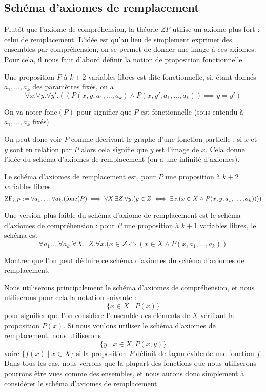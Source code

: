 \subsection{Schéma d'axiomes de remplacement}

Plutôt que l'axiome de compréhension, la théorie $ZF$ utilise un axiome plus fort : celui de remplacement. L'idée est qu'au lieu de simplement exprimer des ensembles par compréhension, on se permet de donner une image à ces axiomes. Pour cela, il nous faut d'abord définir la notion de proposition fonctionnelle.

\begin{defi}
    Une proposition $P$ à $k+2$ variables libres est dite fonctionnelle, si, étant donnés $a_1,\ldots,a_k$ des paramètres fixés, on a $$\forall x.\forall y.\forall y'. ((P(x,y,a_1,\ldots,a_k)\land P(x,y',a_1,\ldots,a_k))\implies y=y')$$

    On va noter $\mathrm{fonc}(P)$ pour signifier que $P$ est fonctionnelle (sous-entendu à $a_1,\ldots,a_k$ fixés).
\end{defi}

On peut donc voir $P$ comme décrivant le graphe d'une fonction partielle : si $x$ et $y$ sont en relation par $P$ alors cela signifie que $y$ est l'image de $x$. Cela donne l'idée du schéma d'axiomes de remplacement (on a une infinité d'axiomes).

\begin{ax}[Remplacement]
    Le schéma d'axiomes de remplacement est, pour $P$ une proposition à $k+2$ variables libres : $$\mathrm{ZF}_{7,P} := \forall a_1.\ldots\forall a_k.(\mathrm{fonc}(P)\implies \forall X.\exists Z. \forall y. (y\in Z \iff \exists x.(x\in X \land P(x,y,a_1,\ldots,a_k))))$$
\end{ax}

\begin{exo}
    Une version plus faible du schéma d'axiome de remplacement est le schéma d'axiomes de compréhension : pour $P$ une proposition à $k+1$ variables libres, le schéma est $$\forall a_1.\ldots\forall a_k.\forall X. \exists Z. \forall x. (x\in Z \iff (x\in X\land P(x,a_1,\ldots,a_k))$$

    Montrer que l'on peut déduire ce schéma d'axiomes du schéma d'axiomes de remplacement.
\end{exo}

Nous utiliserons principalement le schéma d'axiomes de compréhension, et nous utiliserons pour cela la notation suivante : $$\{ x\in X\mid P(x)\}$$ pour signifier que l'on considère l'ensemble des éléments de $X$ vérifiant la proposition $P(x)$. Si nous voulons utiliser le schéma d'axiomes de remplacement, nous utiliserons $$\{y \mid x\in X, P(x,y)\}$$ voire $\{f(x)\mid x \in X\}$ si la proposition $P$ définit de façon évidente une fonction $f$. Dans tous les cas, nous verrons que la plupart des fonctions que nous utiliserons pourrons être vues comme des ensembles, et nous aurons donc simplement à considérer le schéma d'axiomes de remplacement.

